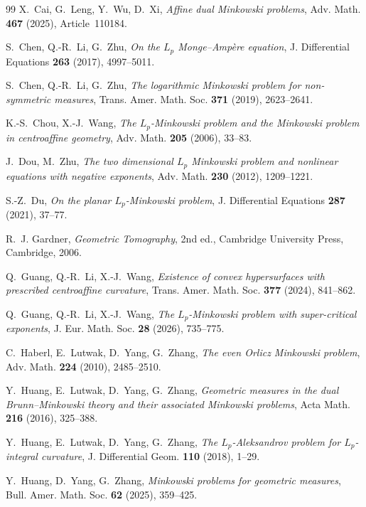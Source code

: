 \documentclass[12pt,reqno]{amsart}
\numberwithin{equation}{section}
\theoremstyle{remark}
\begin{document}
\begin{thebibliography}{99}
	X.~Cai, G.~Leng, Y.~Wu,  D.~Xi,
	\emph{Affine dual Minkowski problems},
	Adv. Math. \textbf{467} (2025), Article~110184.
	
	S.~Chen, Q.-R.~Li,  G.~Zhu,
	\emph{On the $L_p$ Monge--Amp\`ere equation},
	J. Differential Equations \textbf{263} (2017), 4997--5011.
	
	S.~Chen, Q.-R.~Li,  G.~Zhu,
	\emph{The logarithmic Minkowski problem for non-symmetric measures},
	Trans. Amer. Math. Soc. \textbf{371} (2019), 2623--2641.
	
	K.-S.~Chou,  X.-J.~Wang,
	\emph{The $L_p$-Minkowski problem and the Minkowski problem in centroaffine geometry},
	Adv. Math. \textbf{205} (2006), 33--83.
	
	J.~Dou,  M.~Zhu,
	\emph{The two dimensional $L_p$ Minkowski problem and
		nonlinear equations with negative exponents},
	Adv. Math. \textbf{230} (2012), 1209--1221.
	
	S.-Z.~Du,
	\emph{On the planar $L_p$-Minkowski problem},
	J. Differential Equations \textbf{287} (2021), 37--77.
	
	R.~J. Gardner,
	\emph{Geometric Tomography},
	2nd ed., Cambridge University Press, Cambridge, 2006.
	
	
	Q.~Guang, Q.-R.~Li,  X.-J.~Wang,
	\emph{Existence of convex hypersurfaces with prescribed centroaffine curvature},
	Trans. Amer. Math. Soc. \textbf{377} (2024), 841--862.
	
	Q.~Guang, Q.-R.~Li,  X.-J.~Wang,
	\emph{The $L_p$-Minkowski problem with super-critical exponents},
	J. Eur. Math. Soc. \textbf{28} (2026), 735--775.
	
	C.~Haberl, E.~Lutwak, D.~Yang,  G.~Zhang,
	\emph{The even Orlicz Minkowski problem},
	Adv. Math. \textbf{224} (2010), 2485--2510.
	
	Y.~Huang, E.~Lutwak, D.~Yang,  G.~Zhang,
	\emph{Geometric measures in the dual Brunn--Minkowski theory and their associated Minkowski problems},
	Acta Math. \textbf{216} (2016), 325--388.
	
	Y.~Huang, E.~Lutwak, D.~Yang,  G.~Zhang,
	\emph{The $L_p$-Aleksandrov problem for $L_p$-integral curvature},
	J. Differential Geom. \textbf{110} (2018), 1--29.
	
	Y.~Huang, D.~Yang,  G.~Zhang,
	\emph{Minkowski problems for geometric measures},
	Bull. Amer. Math. Soc. \textbf{62} (2025), 359--425.
	

\end{thebibliography}
\end{document}
